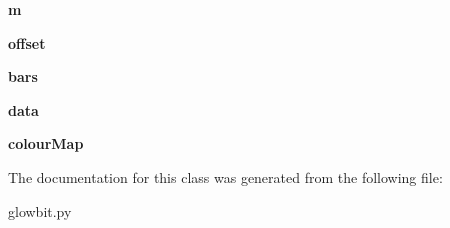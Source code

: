 \begin{DoxyCompactItemize}
{\bfseries m}
\item 
\mbox{\label{classglowbit_1_1glowbitMatrix_1_1graph2D_ac8cfe4f990570e96ee4afd5d9400371b}} 
{\bfseries offset}
\item 
\mbox{\label{classglowbit_1_1glowbitMatrix_1_1graph2D_a3dc420308e355151a6e6d1943a473a94}} 
{\bfseries bars}
\item 
\mbox{\label{classglowbit_1_1glowbitMatrix_1_1graph2D_a5a11fc642d5ad79ab08e5d806b0bab77}} 
{\bfseries data}
\item 
\mbox{\label{classglowbit_1_1glowbitMatrix_1_1graph2D_a116e7d95ab5e0b13ea8f57582bfa15e4}} 
{\bfseries colour\+Map}
\end{DoxyCompactItemize}


The documentation for this class was generated from the following file\+:\begin{DoxyCompactItemize}
\item 
glowbit.\+py\end{DoxyCompactItemize}
